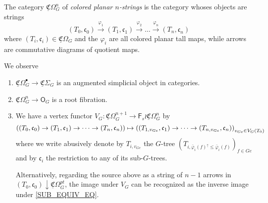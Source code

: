 \documentclass[a4paper,10pt
]{article}%
\renewcommand{\phi}{\varphi}
\newcommand{\UC}{\underline{\mathfrak C}}
\renewcommand{\1}{\ensuremath{\mathbb{id}}}
\begin{document}
\begin{definition}
      The category $\UC\Omega_G^n$ of \textit{colored planar $n$-strings} is the category
      whoses objects are strings
      \begin{equation}
            (T_0,\mathfrak c_0)
            \xrightarrow{\phi_1} (T_1, \mathfrak c_1)
            \xrightarrow{\phi_2} \ldots
            \xrightarrow{\phi_n} (T_n, \mathfrak c_n)
      \end{equation}
      where $(T_i, \mathfrak c_i) \in \UC\Omega_G$ and the $\phi_i$ are all colored planar tall maps,
      while arrows are commutative diagrams of quotient maps.
\end{definition}

\begin{remark}
      We observe
      \begin{enumerate}
      \item $\UC\Omega_G^\bullet \to \UC\Sigma_G$ is an augmented simplicial object in categories.
      \item $\UC\Omega_G^n \to \mathsf O_G$ is a root fibration.
      \item We have a vertex functor $V_G: \UC\Omega_G^{n+1} \to \mathsf F_s \wr \UC\Omega_G^n$ by
            \begin{equation}
                  \left(
                  (T_0,\mathfrak c_0)
                  \to (T_1, \mathfrak c_1)
                  \to \dots
                  \to (T_n, \mathfrak c_n)
                  \large)
                  \mapsto
                  \large(
                  (T_{1,v_{Ge}},\mathfrak c_1)
                  \to \dots \to
                  (T_{n,v_{Ge}}, \mathfrak c_n)
                  \right)_{v_{Ge} \in V_G(T_0)}
            \end{equation}
            where we write abusively denote by $T_{i,v_{Ge}}$ the $G$-tree $(T_{i,\bar\phi_i(f)^\uparrow \leq \bar\phi_i(f)})_{f \in Ge}$
            and by $\mathfrak c_i$ the restriction to any of its sub-$G$-trees.

            Alternatively, regarding the source above as a string of $n-1$ arrows in
            $(T_0, \mathfrak c_0) \downarrow \UC\Omega_G^{pt}$,
            the image under $V_G$ can be recognized as the inverse image under \eqref{SUB_EQUIV_EQ}.
      \end{enumerate}
\end{remark}
\end{document}
